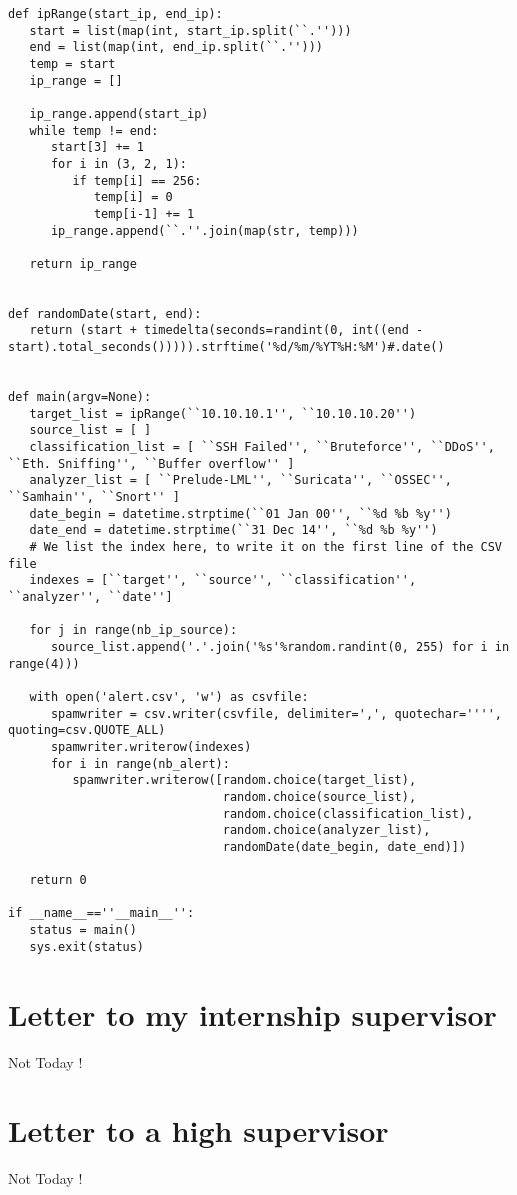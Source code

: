 \documentclass{koala-en}
\begin{document}
\begin{lstlisting}
def ipRange(start_ip, end_ip):
   start = list(map(int, start_ip.split(``.'')))
   end = list(map(int, end_ip.split(``.'')))
   temp = start
   ip_range = []

   ip_range.append(start_ip)
   while temp != end:
      start[3] += 1
      for i in (3, 2, 1):
         if temp[i] == 256:
            temp[i] = 0
            temp[i-1] += 1
      ip_range.append(``.''.join(map(str, temp)))

   return ip_range


def randomDate(start, end):
   return (start + timedelta(seconds=randint(0, int((end - start).total_seconds())))).strftime('%d/%m/%YT%H:%M')#.date()


def main(argv=None):
   target_list = ipRange(``10.10.10.1'', ``10.10.10.20'')
   source_list = [ ]
   classification_list = [ ``SSH Failed'', ``Bruteforce'', ``DDoS'', ``Eth. Sniffing'', ``Buffer overflow'' ]
   analyzer_list = [ ``Prelude-LML'', ``Suricata'', ``OSSEC'', ``Samhain'', ``Snort'' ]
   date_begin = datetime.strptime(``01 Jan 00'', ``%d %b %y'')
   date_end = datetime.strptime(``31 Dec 14'', ``%d %b %y'')
   # We list the index here, to write it on the first line of the CSV file
   indexes = [``target'', ``source'', ``classification'', ``analyzer'', ``date'']

   for j in range(nb_ip_source):
      source_list.append('.'.join('%s'%random.randint(0, 255) for i in range(4)))

   with open('alert.csv', 'w') as csvfile:
      spamwriter = csv.writer(csvfile, delimiter=',', quotechar='''', quoting=csv.QUOTE_ALL)
      spamwriter.writerow(indexes)
      for i in range(nb_alert):
         spamwriter.writerow([random.choice(target_list),
                              random.choice(source_list),
                              random.choice(classification_list),
                              random.choice(analyzer_list),
                              randomDate(date_begin, date_end)])

   return 0

if __name__==''__main__'':
   status = main()
   sys.exit(status)
\end{lstlisting}

\thispagestyle{fancy}
\newpage


\printglossary[style=altlisthypergroup]

\thispagestyle{fancy}

\part{Letter to my internship supervisor}
Not Today !

\thispagestyle{fancy}

\part{Letter to a high supervisor}
Not Today !

\thispagestyle{fancy}
\end{document}
